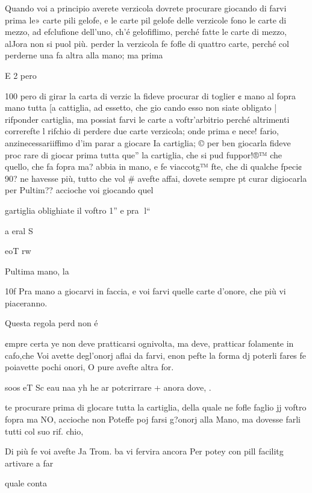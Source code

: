 \documentclass[12pt,a6paper]{article}
\begin{document}
Quando voi a principio averete verzicola dovrete procurare giocando di farvi prima le»
carte pili gelofe, e le carte pil
gelofe delle verzicole fono le
carte di mezzo, ad efclufione
dell’uno, ch’é gelofiflimo, perché fatte le carte di mezzo, alJora non si puol più. perder la
verzicola fe fofle di quattro carte, perché col perderne una
fa altra alla mano; ma prima

E 2 pero

 

 
 

 

 

 

100
pero di girar la carta di verzic
la fideve procurar di toglier ¢
mano al fopra mano tutta [a
cattiglia, ad essetto, che gio
cando esso non siate obligato |
rifponder cartiglia, ma possiat
farvi le carte a voftr’arbitrio
perché altrimenti correrefte l
rifchio di perdere due carte
verzicola; onde prima e nece!
fario, anzinecessariiffimo d’im
parar a giocare Ia cartiglia; ©
per ben giocarla fideve proc
rare di giocar prima tutta que”
la cartiglia, che si pud fuppor!®™
che quello, che fa fopra ma?
abbia in mano, e fe viaccotg™
fte, che di qualche fpeci¢ 90?
ne havesse più, tutto che vol #
avefte affai, dovete sempre pt
curar digiocarla per Pultim??
accioche voi giocando quel

gartiglia oblighiate il voftro 1”
e pra
l“

a eral S

eoT rw

Pultima mano, la

10f
Pra mano a giocarvi in faccia,
e voi farvi quelle carte d’onore,
che più vi piaceranno.

Questa regola perd non é

¢mpre certa ye non deve pratticarsi ognivolta, ma deve,
pratticar folamente in cafo,che
Voi avette degl’onorj aflai da
farvi, enon pefte la forma dj
poterli fares fe poiavette pochi
onori, O pure avefte altra for.

soos eT Sc eau naa yh
he ar potcrirrare + anora dove, .

te procurare prima di glocare
tutta la cartiglia, della quale ne
fofle faglio jj voftro fopra ma
NO, accioche non Poteffe poj
farsi g?onorj alla Mano, ma dovesse farli tutti col suo rif.
chio,

Di più fe voi avefte Ja Trom.
ba vi fervira ancora Per potey
con pill facilitg artivare a far

quale conta
\end{document}
